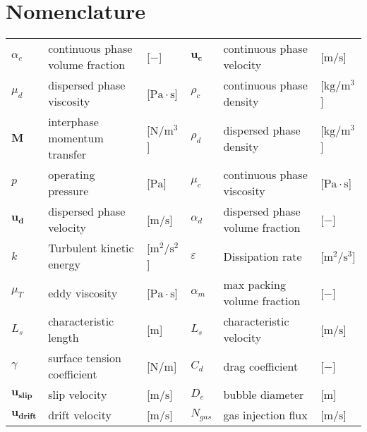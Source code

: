 \chapter*{Nomenclature}

\begin{center}
\renewcommand{\arraystretch}{1.7}
\begin{tabular}{l l l| l l l}

  $\alpha_c$  &  continuous phase volume fraction & [$-$] & $\mathbf{u_c}$ & continuous phase velocity & [$\mathrm{m/s}$]\\
   
  $\mu_d$ & dispersed phase viscosity & [$ \mathrm{Pa \cdot s}$] & $\rho_c$ & continuous phase density & [$\mathrm{kg/m^3}$]\\
   
  $\mathbf{M}$ & interphase momentum transfer & [$\mathrm{N/m^3}$] & $\rho_d$ & dispersed phase density & [$\mathrm{kg/m^3}$]\\
   
  $p$ & operating pressure & [$\mathrm{Pa}$] & $\mu_c$ & continuous phase viscosity & [$\mathrm{Pa \cdot s}$]\\
   
  $\mathbf{u_d}$ & dispersed phase velocity & [$\mathrm{m/s}$] & 
  $\alpha_d$ & dispersed phase volume fraction & [$-$]\\
  
  $k$  &  Turbulent kinetic energy & [$\mathrm{m^2/s^2}$] & $\varepsilon$ & Dissipation rate & [$\mathrm{m^2/s^3}$]\\
   
  $\mu_T$ & eddy viscosity & [$ \mathrm{Pa \cdot s}$] & $\alpha_m$ & max packing volume fraction & [$-$]\\
  
  $L_s$ & characteristic length & [$\mathrm{m}$] & $L_s$ & characteristic velocity & [$\mathrm{m/s}$]\\
  
  $\gamma$ & surface tension coefficient & [$\mathrm{N/m}$] & $C_d$ & drag coefficient & [$-$] \\
  
  $\mathbf{u_{slip}}$ & slip velocity & [$\mathrm{m/s}$] & $D_e$ & bubble diameter & [$\mathrm{m}$] \\
  
  $\mathbf{u_{drift}}$ & drift velocity & [$\mathrm{m/s}$] & $N_{gas}$ & gas injection flux & [$\mathrm{m/s}$]\\
  

\end{tabular}
\end{center}
